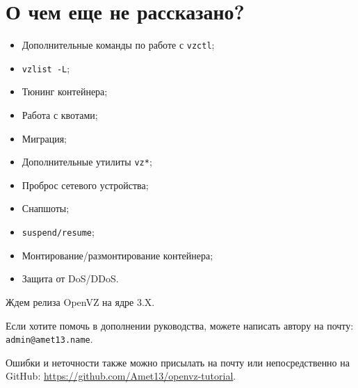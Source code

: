 \section{О чем еще не рассказано?}

\begin{itemize}
    \item Дополнительные команды по работе с \texttt{vzctl};
    \item \texttt{vzlist -L};
    \item Тюнинг контейнера;
    \item Работа с квотами;
    \item Миграция;
    \item Дополнительные утилиты \texttt{vz*};
    \item Проброс сетевого устройства;
    \item Снапшоты;
    \item \texttt{suspend/resume};
    \item Монтирование/размонтирование контейнера;
    \item Защита от DoS/DDoS.
\end{itemize}

Ждем релиза OpenVZ на ядре 3.X.

Если хотите помочь в дополнении руководства, можете написать автору на почту: \texttt{admin@amet13.name}.

Ошибки и неточности также можно присылать на почту или непосредственно на GitHub: \url{https://github.com/Amet13/openvz-tutorial}.

\clearpage
